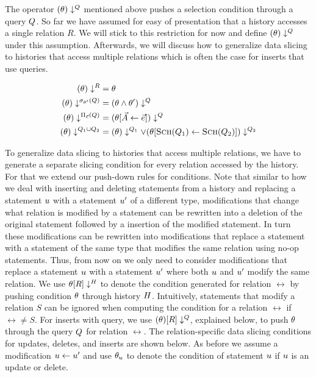The operator $(\theta)\downarrow^{Q}$ mentioned above pushes a selection condition through a query $Q$. So far we have assumed for easy of presentation that a history accesses a single relation $R$. We will stick to this restriction for now and define $(\theta)\downarrow^{Q}$ under this assumption. Afterwards, we will discuss how to generalize data slicing to histories that access multiple relations which is often the case for inserts that use queries.

  \begin{align*}
    (\theta)\downarrow^{R} &= \theta\\
    (\theta)\downarrow^{\sigma_{\theta'}(Q)} &= (\theta \land \theta')\downarrow^{Q}\\
    (\theta)\downarrow^{\Pi_{\vec{e}}(Q)} &= (\theta[\vec{A} \gets \vec{e}])\downarrow^{Q}\\
    (\theta)\downarrow^{Q_1 \cup Q_2} &= (\theta)\downarrow^{Q_1} \lor (\theta[\textsc{Sch}(Q_1) \gets \textsc{Sch}(Q_2)])\downarrow^{Q_2}\\
  \end{align*}

To generalize data slicing to histories that access multiple relations, we have to generate a separate slicing condition for every relation accessed by the history. For that we extend our push-down rules for conditions. Note that similar to how we deal with inserting and deleting statements from a history and replacing a statement $u$ with a statement $u'$ of a different type, modifications that change what relation is modified by a statement can be rewritten into a deletion of the original statement followed by a insertion of the modified statement. In turn these modifications can be rewritten into modifications that replace a statement with a statement of the same type that modifies the same relation using no-op statements. Thus, from now on we only need to consider modifications that replace a statement $u$ with a statement $u'$ where both $u$ and $u'$ modify the same relation. We use ${\theta}[R]\downarrow^{H}$ to denote the condition generated for relation $\rel$ by pushing condition $\theta$ through history $H$. Intuitively, statements that modify a relation $S$ can be ignored when computing the condition for a relation $\rel$ if $\rel \neq S$. For inserts with query, we use $(\theta)[R]\downarrow^{Q}$, explained below, to push $\theta$ through the query $Q$ for relation $\rel$. The relation-specific data slicing conditions for updates, deletes, and inserts are shown below. As before we assume a modification $u \gets u'$ and use $\theta_{u}$ to denote the condition of statement  $u$ if $u$ is an update or delete.

